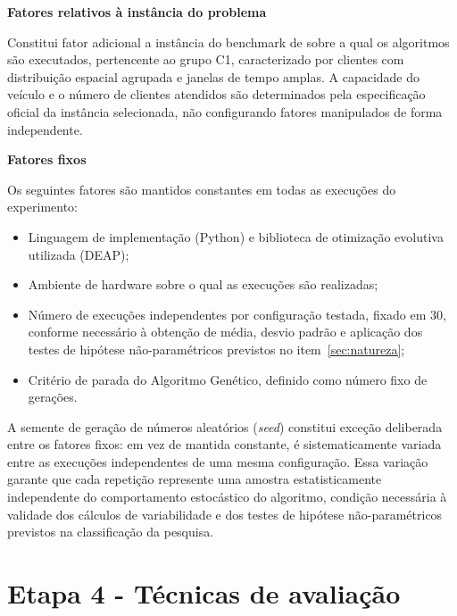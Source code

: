 \begin{alineas}
	\item \textbf{Fatores relativos à instância do problema}

	Constitui fator adicional a instância do benchmark de  sobre a qual os
	algoritmos são executados, pertencente ao grupo C1, caracterizado por clientes com
	distribuição espacial agrupada e janelas de tempo amplas. A capacidade do veículo e
	o número de clientes atendidos são determinados pela especificação oficial da
	instância selecionada, não configurando fatores manipulados de forma independente.

	\item \textbf{Fatores fixos}

	Os seguintes fatores são mantidos constantes em todas as execuções do experimento:

	\begin{itemize}
		\item Linguagem de implementação (Python) e biblioteca de otimização evolutiva
		utilizada (DEAP);
		\item Ambiente de hardware sobre o qual as execuções são realizadas;
		\item Número de execuções independentes por configuração testada, fixado em 30,
		conforme necessário à obtenção de média, desvio padrão e aplicação dos testes de
		hipótese não-paramétricos previstos no item~\ref{sec:natureza};
		\item Critério de parada do Algoritmo Genético, definido como número fixo de
		gerações.
	\end{itemize}

	A semente de geração de números aleatórios (\textit{seed}) constitui exceção
	deliberada entre os fatores fixos: em vez de mantida constante, é sistematicamente
	variada entre as execuções independentes de uma mesma configuração. Essa variação
	garante que cada repetição represente uma amostra estatisticamente independente do
	comportamento estocástico do algoritmo, condição necessária à validade dos cálculos
	de variabilidade e dos testes de hipótese não-paramétricos previstos na
	classificação da pesquisa.
\end{alineas}

\section{Etapa 4 - Técnicas de avaliação}
\label{sec:etapa4}

